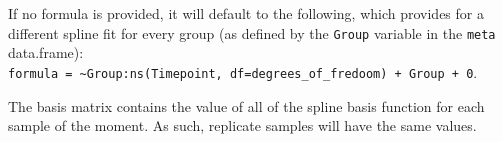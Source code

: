 \documentclass[9pt,a4paper,]{extarticle}
\newenvironment{Shaded}{\begin{snugshade}}{\end{snugshade}}
\newcommand{\DataTypeTok}[1]{\textcolor[rgb]{0.13,0.29,0.53}{#1}}
\newcommand{\DecValTok}[1]{\textcolor[rgb]{0.00,0.00,0.81}{#1}}
\newcommand{\KeywordTok}[1]{\textcolor[rgb]{0.13,0.29,0.53}{\textbf{#1}}}
\newcommand{\NormalTok}[1]{#1}
\newcommand{\OperatorTok}[1]{\textcolor[rgb]{0.81,0.36,0.00}{\textbf{#1}}}
\newcommand{\StringTok}[1]{\textcolor[rgb]{0.31,0.60,0.02}{#1}}
\begin{document}
If no formula is provided, it will default to the following, which provides
for a different spline fit for every group (as defined by the \texttt{Group} variable
in the \texttt{meta} data.frame):
\texttt{formula\ =\ \textasciitilde{}Group:ns(Timepoint,\ df=degrees\_of\_fredoom)\ +\ Group\ +\ 0}.

The basis matrix contains the value of all of the spline basis function for
each sample of the moment. As such, replicate samples will have the same
values.

\begin{Shaded}
\end{Shaded}
\end{document}
